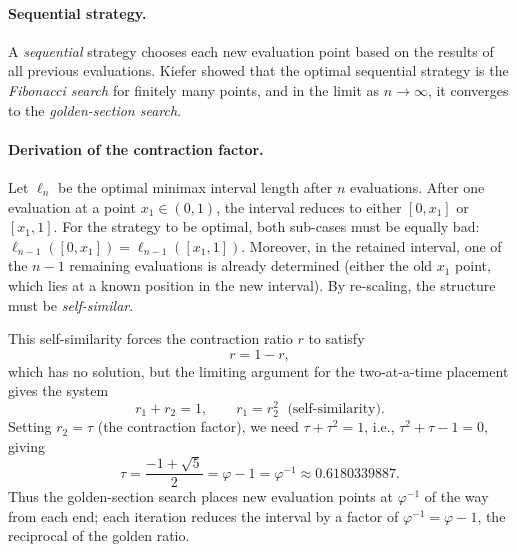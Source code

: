\paragraph{Sequential strategy.}
A \emph{sequential} strategy chooses each new evaluation point based
on the results of all previous evaluations.
Kiefer showed that the optimal sequential strategy is the
\emph{Fibonacci search} for finitely many points, and in the limit
as \(n \to \infty\), it converges to the \emph{golden-section search}.

\paragraph{Derivation of the contraction factor.}
Let \(\ell_n\) be the optimal minimax interval length after \(n\)
evaluations.  After one evaluation at a point \(x_1 \in (0,1)\),
the interval reduces to either \([0,x_1]\) or \([x_1,1]\).
For the strategy to be optimal, both sub-cases must be equally bad:
\(\ell_{n-1}([0,x_1]) = \ell_{n-1}([x_1,1])\).
Moreover, in the retained interval, one of the \(n-1\) remaining
evaluations is already determined (either the old \(x_1\) point, which
lies at a known position in the new interval).  By re-scaling,
the structure must be \emph{self-similar}.

This self-similarity forces the contraction ratio \(r\) to satisfy
\begin{equation}\label{eq:gh-contraction}
  r = 1 - r,
\end{equation}
which has no solution, but the limiting argument for the two-at-a-time
placement gives the system
\begin{equation}\label{eq:gh-golden-system}
  r_1 + r_2 = 1, \qquad r_1 = r_2^2 \;\text{ (self-similarity)}.
\end{equation}
Setting \(r_2 = \tau\) (the contraction factor), we need
\(\tau + \tau^2 = 1\), i.e., \(\tau^2 + \tau - 1 = 0\),
giving
\begin{equation}\label{eq:gh-tau}
  \tau = \frac{-1+\sqrt{5}}{2} = \varphi - 1 = \varphi^{-1}
       \approx 0.6180339887.
\end{equation}
Thus the golden-section search places new evaluation points at
\(\varphi^{-1}\) of the way from each end; each iteration reduces
the interval by a factor of \(\varphi^{-1} = \varphi - 1\), the
reciprocal of the golden ratio.

